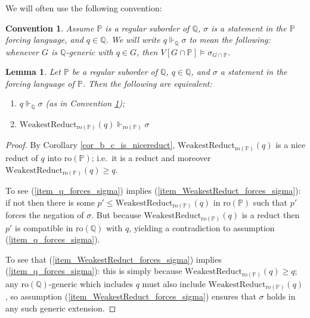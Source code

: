 \documentclass{amsart}
\newtheorem{lemma}[theorem]{Lemma}
\newtheorem{convention}[theorem]{Convention}
\begin{document}
We will often use the following convention:
\begin{convention}\label{conv_ViewNames}
Assume $\mathbb{P}$ is a regular suborder of $\mathbb{Q}$, $\sigma$ is a statement in the $\mathbb{P}$ forcing language, and $q \in \mathbb{Q}$.  We will write $q \Vdash_{\mathbb{Q}} \sigma$ to mean the following: whenever $G$ is $\mathbb{Q}$-generic with $q \in G$, then $V[G \cap \mathbb{P}] \models \sigma_{G \cap \mathbb{P}}$. 
\end{convention}

\begin{lemma}\label{lem_IfWeakestReductForcesThenOrigDoes}
Let $\mathbb{P}$ be a regular suborder of $\mathbb{Q}$, $q \in \mathbb{Q}$, and $\sigma$ a statement in the forcing language of $\mathbb{P}$.  Then the following are equivalent:
\begin{enumerate}
 \item\label{item_q_forces_sigma} $q \Vdash_{\mathbb{Q}} \sigma$ (as in Convention \ref{conv_ViewNames});
 \item\label{item_WeakestReduct_forces_sigma} $\text{WeakestReduct}_{\text{ro}(\mathbb{P})}(q) \Vdash_{\text{ro}(\mathbb{P})} \sigma$
\end{enumerate}
\end{lemma}
\begin{proof}
By Corollary \ref{cor_b_c_is_nicereduct}, $\text{WeakestReduct}_{\text{ro}(\mathbb{P})}(q)$ is a nice reduct of $q$ into $\text{ro}(\mathbb{P})$; i.e.\ it is a reduct and moreover $\text{WeakestReduct}_{\text{ro}(\mathbb{P})}(q) \ge q$.  

To see (\ref{item_q_forces_sigma}) implies (\ref{item_WeakestReduct_forces_sigma}):  if not then there is some $p' \le \text{WeakestReduct}_{\text{ro}(\mathbb{P})}(q)$ in $\text{ro}(\mathbb{P})$ such that $p'$ forces the negation of $\sigma$.  But because $\text{WeakestReduct}_{\text{ro}(\mathbb{P})}(q)$ is a reduct then $p'$ is compatible in $\text{ro}(\mathbb{Q})$ with $q$, yielding a contradiction to assumption (\ref{item_q_forces_sigma}).

To see that (\ref{item_WeakestReduct_forces_sigma}) implies (\ref{item_q_forces_sigma}):  this is simply because $\text{WeakestReduct}_{\text{ro}(\mathbb{P})}(q) \ge q$; any $\text{ro}(\mathbb{Q})$-generic which includes $q$ must also include $\text{WeakestReduct}_{\text{ro}(\mathbb{P})}(q)$, so assumption (\ref{item_WeakestReduct_forces_sigma}) ensures that $\sigma$ holds in any such generic extension.
\end{proof}
\end{document}
